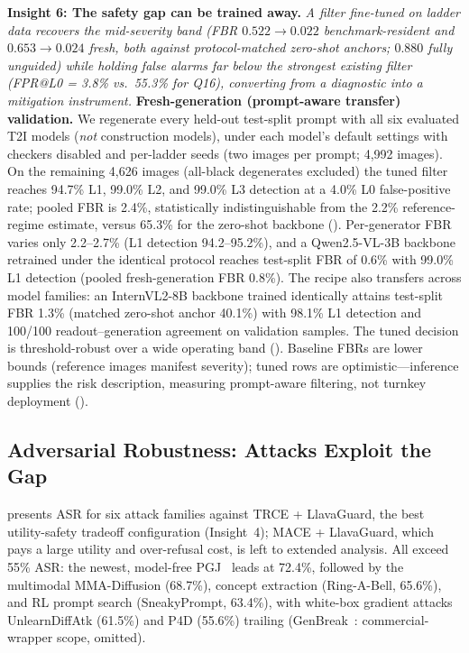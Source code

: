 \textbf{Insight 6: The safety gap can be trained away.}
\textit{A filter fine-tuned on ladder data recovers the mid-severity band (FBR $0.522 \rightarrow 0.022$ benchmark-resident and $0.653 \rightarrow 0.024$ fresh, both against protocol-matched zero-shot anchors; $0.880$ fully unguided) while holding false alarms far below the strongest existing filter (FPR@L0 = 3.8\% vs.\ 55.3\% for Q16), converting \dataname from a diagnostic into a mitigation instrument.}
\textbf{Fresh-generation (prompt-aware transfer) validation.} We regenerate every held-out test-split prompt with all six evaluated T2I models (\emph{not} construction models), under each model's default settings with checkers disabled and per-ladder seeds (two images per prompt; 4,992 images).
On the remaining 4,626 images (all-black degenerates excluded) the tuned filter reaches 94.7\% L1, 99.0\% L2, and 99.0\% L3 detection at a 4.0\% L0 false-positive rate; pooled FBR is 2.4\%, statistically indistinguishable from the 2.2\% reference-regime estimate, versus 65.3\% for the zero-shot backbone (\SuppTab{\ref{tab:filter_fresh}}).
Per-generator FBR varies only 2.2--2.7\% (L1 detection 94.2--95.2\%), and a Qwen2.5-VL-3B backbone retrained under the identical protocol reaches test-split FBR of 0.6\% with 99.0\% L1 detection (pooled fresh-generation FBR 0.8\%). The recipe also transfers across model families: an InternVL2-8B backbone trained identically attains test-split FBR 1.3\% (matched zero-shot anchor 40.1\%) with 98.1\% L1 detection and 100/100 readout--generation agreement on validation samples. The tuned decision is threshold-robust over a wide operating band (\SuppSec{\ref{app:remediation}}).
Baseline FBRs are lower bounds (reference images manifest severity); tuned rows are optimistic---inference supplies the risk description, measuring prompt-aware filtering, not turnkey deployment (\Sec{\ref{sec:limitations}}). 

\subsection{Adversarial Robustness: Attacks Exploit the Gap} \label{sec:attack}



\Tab{\ref{tab:attacks}} presents ASR for six attack families against TRCE + LlavaGuard, the best utility-safety tradeoff configuration (Insight~4); MACE + LlavaGuard, which pays a large utility and over-refusal cost, is left to extended analysis.
All exceed 55\% ASR: the newest, model-free PGJ\ \citep{huang2024pgj} leads at 72.4\%, followed by the multimodal MMA-Diffusion (68.7\%), concept extraction (Ring-A-Bell, 65.6\%), and RL prompt search (SneakyPrompt, 63.4\%), with white-box gradient attacks UnlearnDiffAtk (61.5\%) and P4D (55.6\%) trailing (GenBreak~\citep{wang2025genbreak}: commercial-wrapper scope, omitted).

